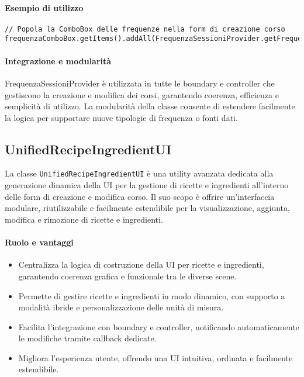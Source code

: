 \paragraph{Esempio di utilizzo}
\begin{verbatim}
// Popola la ComboBox delle frequenze nella form di creazione corso
frequenzaComboBox.getItems().addAll(FrequenzaSessioniProvider.getFrequenze());
\end{verbatim}

\paragraph{Integrazione e modularità}
FrequenzaSessioniProvider è utilizzata in tutte le boundary e controller che gestiscono la creazione e modifica dei corsi, garantendo coerenza, efficienza e semplicità di utilizzo. La modularità della classe consente di estendere facilmente la logica per supportare nuove tipologie di frequenza o fonti dati.

\subsection{UnifiedRecipeIngredientUI}
La classe \texttt{UnifiedRecipeIngredientUI} è una utility avanzata dedicata alla generazione dinamica della UI per la gestione di ricette e ingredienti all'interno delle form di creazione e modifica corso. Il suo scopo è offrire un'interfaccia modulare, riutilizzabile e facilmente estendibile per la visualizzazione, aggiunta, modifica e rimozione di ricette e ingredienti.

\paragraph{Ruolo e vantaggi}
\begin{itemize}
    \item Centralizza la logica di costruzione della UI per ricette e ingredienti, garantendo coerenza grafica e funzionale tra le diverse scene.
    \item Permette di gestire ricette e ingredienti in modo dinamico, con supporto a modalità ibride e personalizzazione delle unità di misura.
    \item Facilita l'integrazione con boundary e controller, notificando automaticamente le modifiche tramite callback dedicate.
    \item Migliora l'esperienza utente, offrendo una UI intuitiva, ordinata e facilmente estendibile.
\end{itemize}


